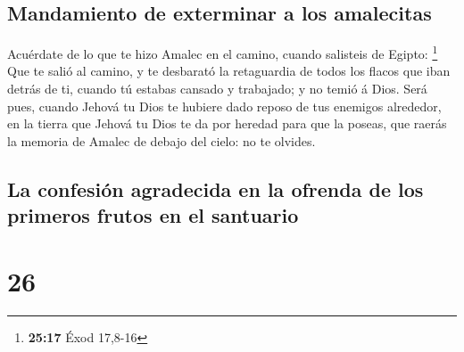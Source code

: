 \hypertarget{mandamiento-de-exterminar-a-los-amalecitas}{%
\subsection{Mandamiento de exterminar a los
amalecitas}\label{mandamiento-de-exterminar-a-los-amalecitas}}

 Acuérdate de lo que te hizo Amalec en el camino, cuando
salisteis de Egipto: \footnote{\textbf{25:17} Éxod 17,8-16}
 Que te salió al camino, y te desbarató la retaguardia de
todos los flacos que iban detrás de ti, cuando tú estabas cansado y
trabajado; y no temió á Dios.  Será pues, cuando Jehová
tu Dios te hubiere dado reposo de tus enemigos alrededor, en la tierra
que Jehová tu Dios te da por heredad para que la poseas, que raerás la
memoria de Amalec de debajo del cielo: no te olvides.

\hypertarget{la-confesiuxf3n-agradecida-en-la-ofrenda-de-los-primeros-frutos-en-el-santuario}{%
\subsection{La confesión agradecida en la ofrenda de los primeros frutos
en el
santuario}\label{la-confesiuxf3n-agradecida-en-la-ofrenda-de-los-primeros-frutos-en-el-santuario}}

\hypertarget{section-25}{%
\section{26}\label{section-25}}

